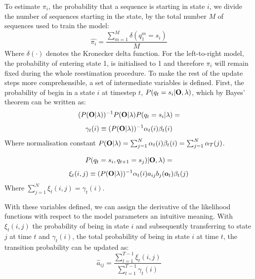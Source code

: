 \documentclass[conference]{IEEEtran}
\begin{document}
To estimate $\pi_{i}$, the probability that a sequence is starting in state $i$, we divide the number of sequences starting in the state, by the total number $M$ of sequences used to train the model:
\begin{equation}
 \hat{\pi_{i}} = \frac{ \displaystyle \sum_{m = 1}^{M} \delta(q_{1}^{m} = s_{i}) }{M}
\end{equation}
Where $\delta(\cdot)$ denotes the Kronecker delta function. For the left-to-right model, the probability of entering state 1, is initialised to 1 and therefore $\pi_{i}$ will remain fixed during the whole reestimation procedure. To make the rest of the update steps more comprehensible, a set of intermediate variables is defined. First, the probability of begin in a state $i$ at timestep $t$, $P(q_{t} = s_{i} | {\bf O}, \lambda )$, which by Bayes' theorem can be written as:
\[
 (P({\bf O}|\lambda))^{-1} P({\bf O}|\lambda )P(q_{t} = s_{i}|\lambda) = 
\]
\begin{equation}
 \gamma_{t}(i) \equiv (P({\bf O}|\lambda))^{-1} \alpha_{t}(i)\beta_{t}(i) 
\end{equation}
Where normalisation constant $P({\bf O}|\lambda) = \sum_{j=1}^{N} \alpha_{t}(i)\beta_{t}(i) = \sum_{j=1}^{N} \alpha_{T}(j)$.


\[
 P(q_{t} = s_{i},q_{t+1} = s_{j}) | {\bf O}, \lambda) =
\]
\[
 \xi_{t}(i,j) \equiv (P({\bf O}|\lambda))^{-1} \alpha_{t}(i)a_{ij}b_{j}({\bf o}_{t})\beta_{t}(j)
\]
Where $\sum_{j=1}^{N} \xi_{t}(i,j) = \gamma_{t}(i)$.

With these variables defined, we can assign the derivative of the likelihood functions with respect to the model parameters an intuitive meaning. With $\xi_{t}(i,j)$ the probability of being in state $i$ and subsequently transferring to state $j$ at time $t$ and $\gamma_{t}(i)$, the total probability of being in state $i$ at time $t$, the transition probability can be updated as:
\begin{equation}
 \hat{a}_{ij} = \frac{\displaystyle \sum_{t=1}^{T-1} \xi_{t}(i,j) } {\displaystyle \sum_{t=1}^{T-1} \gamma_{t}(i) }
\end{equation}
\end{document}
